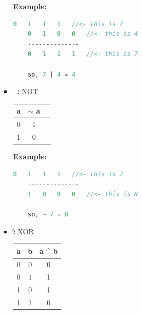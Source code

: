\documentclass[12pt]{article}
\begin{document}
\begin{itemize}
\begin{itemize}
\begin{itemize}
            \bigskip

            \textbf{Example:}

            \bigskip

    \begin{lstlisting}[language=c]
    0   1   1   1   //<- this is 7
    0   1   0   0   //<- this is 4
    --------------
    0   1   1   1   //<- this is 7

    so, 7 | 4 = 4
    \end{lstlisting}


            \item \textbf{~:} NOT

            \bigskip

            \begin{center}
                \begin{tabular}{|c|c|c|}
                    \hline
                    a & $\sim$ a\\
                    \hline
                    0 & 1\\
                    1 & 0\\
                    \hline
                \end{tabular}
            \end{center}

            \bigskip

            \textbf{Example:}

            \bigskip

    \begin{lstlisting}[language=c]
    0   1   1   1   //<- this is 7
    --------------
    1   0   0   0   //<- this is 8

    so, ~ 7 = 8
    \end{lstlisting}

            \item \textbf{\^:} XOR

            \bigskip

            \begin{center}
                \begin{tabular}{|c|c|c|}
                    \hline
                    a & b & a \^{} b\\
                    \hline
                    0 & 0  & 0 \\
                    0 & 1  & 1 \\
                    1 & 0  & 1 \\
                    1 & 1  & 0 \\
                    \hline
                \end{tabular}
            \end{center}


\end{itemize}
\end{itemize}
\end{itemize}
\end{document}
